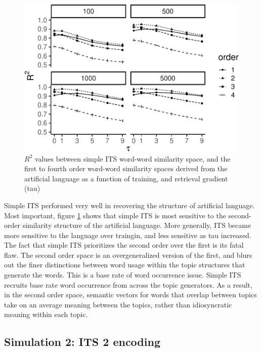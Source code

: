 \documentclass[
  jou]{apa6}
\begin{document}
\begin{figure}
\centering
\includegraphics{ITS_cogsci_files/figure-latex/ITSsimple-1.pdf}
\caption{\label{fig:ITSsimple}\(R^2\) values between simple ITS word-word similarity space, and the first to fourth order word-word similarity spaces derived from the artificial language as a function of training, and retrieval gradient (tau)}
\end{figure}

Simple ITS performed very well in recovering the structure of artificial language. Most important, figure \ref{fig:ITSsimple} shows that simple ITS is most sensitive to the second-order similarity structure of the artificial language. More generally, ITS became more sensitive to the language over traingin, and less sensitive as tau increased. The fact that simple ITS prioritizes the second order over the first is its fatal flaw. The second order space is an overgeneralized version of the first, and blurs out the finer distinctions between word usage within the topic structures that generate the words. This is a base rate of word occurrence issue. Simple ITS recruits base rate word occurrence from across the topic generators. As a result, in the second order space, semantic vectors for words that overlap between topics take on an average meaning between the topics, rather than idiosyncratic meaning within each topic.

\hypertarget{simulation-2-its-2-encoding}{%
\subsection{Simulation 2: ITS 2 encoding}\label{simulation-2-its-2-encoding}}
\end{document}
